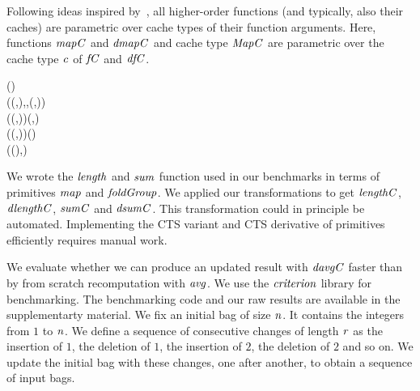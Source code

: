 Following ideas inspired by~\citet{Rossberg2010fing}, all higher-order functions
(and typically, also their caches) are parametric over cache types of their
function arguments. Here, functions \ensuremath{\Varid{mapC}} and \ensuremath{\Varid{dmapC}} and cache type \ensuremath{\Conid{MapC}}
are parametric over the cache type \ensuremath{\Varid{c}} of \ensuremath{\Varid{fC}} and \ensuremath{\Varid{dfC}}.
\begin{hscode}\SaveRestoreHook
{}%
%
%
\>[B]{}\mathrel{:\mkern-1mu:}(\to {})\to {}\;\to {}\;\<[E]%
\\[\blanklineskip]%
\>[B]{}\;\;\;\;\mathrel{=}(\to (,),\;,\;\;(,)){}\<[E]%
\\
\>[B]{}\mathrel{:\mkern-1mu:}(\to (,))\to {}\;\to (\;,\;\;\;){}\<[E]%
\\
\>[B]{}\mathrel{:\mkern-1mu:}(\Delta {}\to {}\to (\Delta {},))\to \Delta (\;)\to {}\<[E]%
\\
\>[B]{}\<[3]%
\>[3]{}\;\;\;\to (\Delta (\;),\;\;\;){}\<[E]%
\ColumnHook
\end{hscode}\resethooks

We wrote the \ensuremath{\Varid{length}} and \ensuremath{\Varid{sum}} function used in our benchmarks in terms of
primitives \ensuremath{\Varid{map}} and \ensuremath{\Varid{foldGroup}}. We applied our transformations to get
\ensuremath{\Varid{lengthC}}, \ensuremath{\Varid{dlengthC}}, \ensuremath{\Varid{sumC}} and \ensuremath{\Varid{dsumC}}. This transformation could in
principle be automated. Implementing the CTS variant and CTS derivative of
primitives efficiently requires manual work.


We evaluate whether we can produce an updated result with \ensuremath{\Varid{davgC}} faster than
by from scratch recomputation with \ensuremath{\Varid{avg}}. We use the \ensuremath{\Varid{criterion}} library for
benchmarking. The benchmarking code and our raw results are available in the
supplementarty material. We fix an initial bag of size \ensuremath{\Varid{n}}. It contains the
integers
from \ensuremath{\mathrm{1}} to \ensuremath{\Varid{n}}. We define a sequence of consecutive changes of length \ensuremath{\Varid{r}}
as the insertion of \ensuremath{\mathrm{1}}, the deletion of \ensuremath{\mathrm{1}}, the insertion of \ensuremath{\mathrm{2}}, the deletion
of \ensuremath{\mathrm{2}} and so on. We update the initial bag with these changes, one after
another, to obtain a sequence of input bags.

